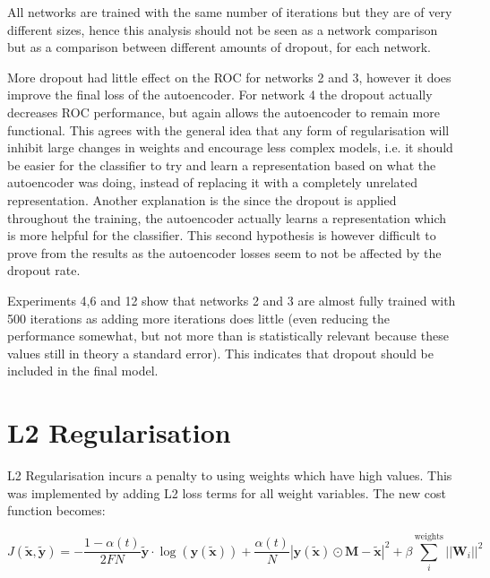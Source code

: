       All networks are trained with the same number of iterations but they are of very different sizes,
      hence this analysis should not be seen as a network comparison but as a comparison between different amounts of dropout, for each network.

      More dropout had little effect on the ROC for networks 2 and 3, however it does
      improve the final loss of the autoencoder. For network 4 the dropout actually decreases
      ROC performance, but again allows the autoencoder to remain more functional. This
      agrees with the general idea that any form of regularisation will inhibit large changes
      in weights and encourage less complex models, i.e. it should be easier for the classifier to try and learn
      a representation based on what the autoencoder was doing, instead of replacing it with a completely unrelated
      representation. Another explanation is the since the dropout is applied throughout the training, the autoencoder
      actually learns a representation which is more helpful for the classifier. This second hypothesis is
      however difficult to prove from the results as the autoencoder losses seem to not be affected by the dropout rate.

      Experiments 4,6 and 12 show that networks 2 and 3 are almost fully trained
      with 500 iterations as adding more iterations does little (even reducing the performance somewhat, but not more than is statistically relevant because
      these values still in theory a standard error). This indicates that dropout should be included in the final model.


      \newpage
    \section{L2 Regularisation}
      L2 Regularisation incurs a penalty to using weights which have high values. This was implemented by adding L2
      loss terms for all weight variables. The new cost function becomes:

      \begin{equation} \label{eq:l2_cost_model}
          J(\tilde{\mathbf{x}},\tilde{\mathbf{y}}) = -\frac{1-\alpha(t)}{2FN}\tilde{\mathbf{y}}\cdot\log(\mathbf{y}(\tilde{\mathbf{x}}))
          + \frac{\alpha(t)}{N}\left |\mathbf{y}(\tilde{\mathbf{x}}) \odot \mathbf{M}-\tilde{\mathbf{x}}\right | ^2
          + \beta \sum_i^{\text{weights}}||\mathbf{W}_i||^2
      \end{equation}

